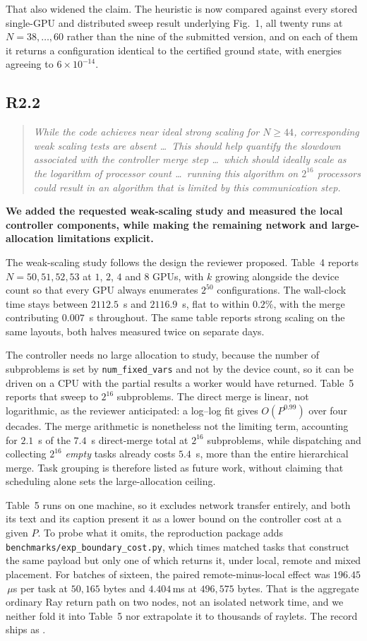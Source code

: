 \documentclass[11pt,a4paper]{article}
\newenvironment{reviewercomment}
  {\begin{quote}\itshape\small}
  {\end{quote}}
\newcommand{\point}[2]{%
  \subsection*{#1}%
  \begin{reviewercomment}#2\end{reviewercomment}}
\begin{document}
That also widened the claim. The heuristic is now compared against every stored single-GPU and
distributed sweep result underlying Fig.~1, all twenty runs at $N=38,\dots,60$ rather than the
nine of the submitted version, and on each of them it returns a configuration identical to the
certified ground state, with energies agreeing to $6\times10^{-14}$.

\point{R2.2}{While the code achieves near ideal strong scaling for $N \ge 44$, corresponding
weak scaling tests are absent \dots\ This should help quantify the slowdown associated with the
controller merge step \dots\ which should ideally scale as the logarithm of processor count
\dots\ running this algorithm on $2^{16}$ processors could result in an algorithm that is
limited by this communication step.}

\textbf{We added the requested weak-scaling study and measured the local controller
components, while making the remaining network and large-allocation limitations explicit.}

The weak-scaling study follows the design the reviewer proposed. Table~4 reports
$N=50,51,52,53$ at $1$, $2$, $4$ and $8$ GPUs, with $k$ growing alongside the device count so
that every GPU always enumerates $2^{50}$ configurations. The wall-clock time stays between
$2112.5$~s and $2116.9$~s, flat to within $0.2\%$, with the merge contributing $0.007$~s
throughout. The same table reports strong scaling on the same layouts, both halves measured
twice on separate days.

The controller needs no large allocation to study, because the number of subproblems is set by
\texttt{num\_fixed\_vars} and not by the device count, so it can be driven on a CPU with the
partial results a worker would have returned. Table~5 reports that sweep to $2^{16}$
subproblems. The direct merge is linear, not logarithmic, as the reviewer anticipated: a
log--log fit gives $O(P^{0.99})$ over four decades. The merge arithmetic is nonetheless not the
limiting term, accounting for $2.1$~s of the $7.4$~s direct-merge total at $2^{16}$
subproblems, while dispatching and collecting $2^{16}$ \emph{empty} tasks already costs
$5.4$~s, more than the entire hierarchical merge. Task grouping is therefore listed as future
work, without claiming that scheduling alone sets the large-allocation ceiling.

Table~5 runs on one machine, so it excludes network transfer entirely, and both its text and
its caption present it as a lower bound on the controller cost at a given $P$. To probe what it
omits, the reproduction package adds \texttt{benchmarks/exp\_boundary\_cost.py}, which times
matched tasks that construct the same payload but only one of which returns it, under local,
remote and mixed placement. For batches of sixteen, the paired remote-minus-local effect was
$196.45$\,$\mu$s per task at $50{,}165$ bytes and $4.404$\,ms at $496{,}575$ bytes. That is the
aggregate ordinary Ray return path on two nodes, not an isolated network time, and we neither
fold it into Table~5 nor extrapolate it to thousands of raylets. The record ships as
.
\end{document}

